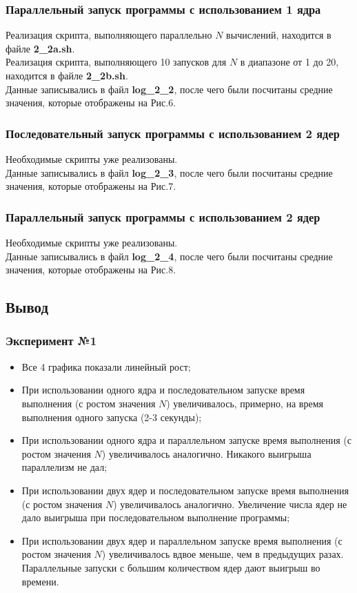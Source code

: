\documentclass{article}
\begin{document}
\subsubsection*{Параллельный запуск программы с использованием 1 ядра}
Реализация скрипта, выполняющего параллельно $N$ вычислений, находится в файле \textbf{2\_2a.sh}. \\
Реализация скрипта, выполняющего 10 запусков для $N$ в диапазоне от 1 до 20, находится в файле \textbf{2\_2b.sh}. \\
Данные записывались в файл \textbf{log\_2\_2}, после чего были посчитаны средние значения, которые отображены на Рис.6.

\subsubsection*{Последовательный запуск программы с использованием 2 ядер}
Необходимые скрипты уже реализованы. \\
Данные записывались в файл \textbf{log\_2\_3}, после чего были посчитаны средние значения, которые отображены на Рис.7.

\subsubsection*{Параллельный запуск программы с использованием 2 ядер}
Необходимые скрипты уже реализованы. \\
Данные записывались в файл \textbf{log\_2\_4}, после чего были посчитаны средние значения, которые отображены на Рис.8.

\bigskip

\subsection*{Вывод}

\subsubsection*{Эксперимент №1}
\begin{itemize}
    \item Все 4 графика показали линейный рост;
    \item При использовании одного ядра и последовательном запуске время выполнения (с ростом значения $N$) увеличивалось, примерно, на время выполнения одного запуска (2-3 секунды);
    \item При использовании одного ядра и параллельном запуске время выполнения (с ростом значения $N$) увеличивалось аналогично. Никакого выигрыша параллелизм не дал;
    \item При использовании двух ядер и последовательном запуске время выполнения (с ростом значения $N$) увеличивалось аналогично. Увеличение числа ядер не дало выигрыша при последовательном выполнение программы;
    \item При использовании двух ядер и параллельном запуске время выполнения (с ростом значения $N$) увеличивалось вдвое меньше, чем в предыдущих разах. Параллельные запуски с большим количеством ядер дают выигрыш во времени.
\end{itemize}
\end{document}
